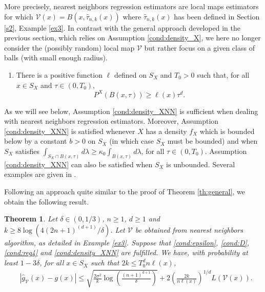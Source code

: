 \documentclass[paper=a4, fontsize=11pt]{scrartcl}
\newtheorem{theorem}{Theorem}
\begin{document}
More precisely, nearest neighbors regression estimators are local maps estimators for which $\mathcal V (x) = B (x, \hat \tau _{n,k}(x) ) $ where $ \hat \tau _{n,k}(x)$ has been defined in Section \ref{s2}, Example \ref{ex3}. In contrast with the general approach developed in the previous section, which relies on Assumption \ref{cond:density_X}, we here no longer consider the (possibly random) local map $\mathcal V$ but rather focus on a given class of balls (with small enough radius).

\begin{enumerate}[label=(XNN), wide=0.5em,  leftmargin=*]
\item  \label{cond:density_XNN} %
There is a positive function $\ell $ defined on $S_X$ and $T_0>0$ such that, for all $x\in S_X$ and $\tau \in (0, T_0)$,
$$ P^X( B(x, \tau) )  \geq   \ell(x)\tau ^d.$$
\end{enumerate}

  As we will see below, Assumption \ref{cond:density_XNN} is sufficient when dealing with nearest neighbors regression estimators. Moreover, Assumption \ref{cond:density_XNN} is satisfied whenever $X$ has a density $f_X$ which is bounded below by a constant $b> 0$ on $S_X$ (in which case $S_X$ must be bounded) and when $S_X$ satisfies $ \int _{S_X \cap B(x,\tau )} d\lambda \geq \kappa_0 \int _{B(x,\tau )} d\lambda$, %
  for all $\tau \in (0, T_0)$. Assumption \ref{cond:density_XNN} can also be satisfied when $S_X$ is unbounded. Several examples are given in  \cite{gadat2016classification}. 

Following an approach quite similar to the proof of Theorem \ref{th:general}, we obtain the following result. 





\begin{theorem}\label{th:NN}
Let $\delta \in (0,1/3) $, $n\geq 1$, $d\geq 1$ and $k\geq  8    \log( 4 (2n+1) ^{(d+1) } / \delta ) $.  Let $\mathcal V $ be obtained from nearest neighbors algorithm, as detailed in Example \ref{ex3}. Suppose that \ref{cond:epsilon}, \ref{cond:D}, \ref{cond:reg4} and  \ref{cond:density_XNN} are fulfilled. We have, with probability at least $1-3\delta$, for all $x\in S_X$ such that $2 k \leq   T_0^d n \ell(x)$,
\begin{align*}
    &|\hat g_{\mathcal V} (x) - g(x) | \leq  \sqrt{\frac{2\sigma^2 }{ k }\log \left( \frac{(n+1)^{d+1}}{\delta }\right)  } + 2 \left(\frac{ 2 k   }{  n \ell(x)  }   \right)^{1/d} L(\mathcal{V}(x)).
\end{align*}
\end{theorem}
\end{document}
